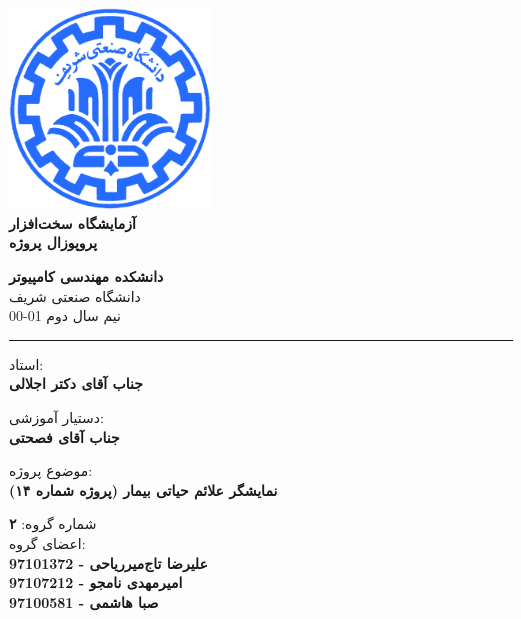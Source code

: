 \documentclass[12pt]{article}
\begin{document}
\begin{titlepage}
\begin{center}
        
\vspace*{0.7cm}

\includegraphics[width=0.4\textwidth]{sharif1.png}\\
\vspace{0.5cm}
\textbf{ \Huge{\emph ‌آزمایشگاه سخت‌افزار} }\\
\vspace{0.5cm}
\textbf{ \Large{ پروپوزال پروژه} }
\vspace{0.2cm}
       
 
      \large \textbf{دانشکده مهندسی کامپیوتر}\\\vspace{0.2cm}
    \large   دانشگاه صنعتی شریف\\\vspace{0.2cm}
       \large   ﻧﯿﻢ سال دوم 01-00 \\\vspace{0.2cm}
      \noindent\rule[1ex]{\linewidth}{1pt}
استاد:\\
    \textbf{{جناب آقای دکتر اجلالی}}


دستیار آموزشی:\\
\textbf{{جناب آقای فصحتی}}

    \vspace{0.25cm}
    
    موضوع پروژه:\\
    
    \textbf{{نمایشگر علائم حیاتی بیمار (پروژه شماره ۱۴)}}
    
    \vspace{0.35cm}
    
    
        شماره گروه:
    \textbf{{۲}}\\
    
اعضای گروه:\\

    \textbf{{علیرضا تاج‌میرریاحی - 97101372}}
    \\
   
     \textbf{{امیرمهدی نامجو - 97107212}}   
   \\
   
    \textbf{{ صبا هاشمی  - 97100581}}
\end{center}
\end{titlepage}
\end{document}

